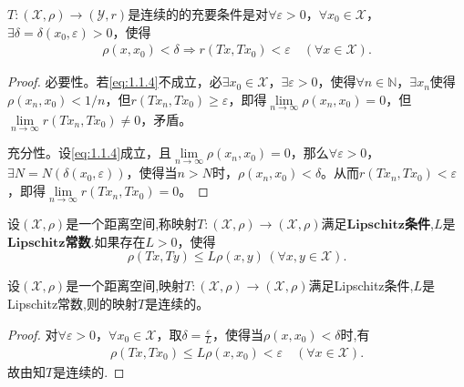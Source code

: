 \documentclass[../../main.tex]{subfiles}
\begin{document}
\begin{proposition}[连续映射充要条件]\label{proposition:距离空间的连续映射充要条件}
$T: (\mathscr{X}, \rho) \to (\mathscr{Y}, r)$是连续的的充要条件是对$\forall \varepsilon > 0$，$\forall x_0 \in \mathscr{X}$，$\exists \delta = \delta(x_0, \varepsilon) > 0$，使得
\begin{align}
\label{eq:1.1.4}
\rho(x, x_0) < \delta \Rightarrow r(Tx, Tx_0) < \varepsilon \quad (\forall x \in \mathscr{X}).
\end{align}
\end{proposition}
\begin{proof}
必要性。若\eqref{eq:1.1.4}不成立，必$\exists x_0 \in \mathscr{X}$，$\exists \varepsilon > 0$，使得$\forall n \in \mathbb{N}$，$\exists x_n$使得$\rho(x_n, x_0) < 1/n$，但$r(Tx_n, Tx_0) \geqslant \varepsilon$，即得$\lim\limits_{n \to \infty} \rho(x_n, x_0) = 0$，但$\lim\limits_{n \to \infty} r(Tx_n, Tx_0) \neq 0$，矛盾。

充分性。设\eqref{eq:1.1.4}成立，且$\lim\limits_{n \to \infty} \rho(x_n, x_0) = 0$，那么$\forall \varepsilon > 0$，$\exists N = N(\delta(x_0, \varepsilon))$，使得当$n > N$时，$\rho(x_n, x_0) < \delta$。从而$r(Tx_n, Tx_0) < \varepsilon$，即得$\lim\limits_{n \to \infty} r(Tx_n, Tx_0) = 0$。

\end{proof}

\begin{definition}
设$(\mathscr{X},\rho)$是一个距离空间,称映射$T:(\mathscr{X},\rho) \to (\mathscr{X},\rho)$满足$\mathbf{Lipschitz}$\textbf{条件},$L$是$\mathbf{Lipschitz}$\textbf{常数}.如果存在$L >0$，使得$$\rho(Tx,Ty) \leqslant L\rho(x,y)\,(\forall x,y \in \mathscr{X}).$$
\end{definition}

\begin{theorem}\label{theorem:满足Lipschitz条件的映射必连续}
设$(\mathscr{X},\rho)$是一个距离空间,映射$T:(\mathscr{X},\rho) \to (\mathscr{X},\rho)$满足Lipschitz条件,$L$是Lipschitz常数,则的映射$T$是连续的。
\end{theorem}
\begin{proof}
对$\forall \varepsilon > 0$，$\forall x_0 \in \mathscr{X}$，取$\delta=\frac{\varepsilon}{L}$，使得当$\rho(x, x_0) < \delta$时,有
\begin{align*}
\rho \left( Tx,Tx_0 \right) \leqslant L\rho \left( x,x_0 \right) <\varepsilon \quad \left( \forall x\in \mathscr{X} \right) .
\end{align*}
故由知$T$是连续的.

\end{proof}
\end{document}

